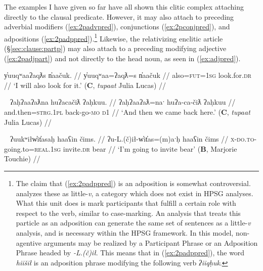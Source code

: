 The examples I have given so far have all shown this clitic complex attaching directly to the clausal predicate. However, it may also attach to preceding adverbial modifiers (\ref{ex:2padvpred}), conjunctions (\ref{ex:2pconjpred}), and adpositions (\ref{ex:2padppred}).\footnote{The claim that (\ref{ex:2padppred}) is an adposition is somewhat controversial. \cite{woo2007b} analyzes these as little-\textit{v}, a category which does not exist in HPSG analyses. What this unit does is mark participants that fulfill a certain role with respect to the verb, similar to case-marking. An analysis that treats this particle as an adposition can generate the same set of sentences as a little-\textit{v} analysis, and is necessary within the HPSG framework. In this model, non-agentive arguments may be realized by a Participant Phrase or an Adposition Phrase headed by \textit{-L.(č)ił}. This means that in (\ref{ex:2padppred}), the word \textit{hiišił} is an adposition phrase modifying the following verb \textit{ʔiiqḥuk}.} Likewise, the relativizing enclitic article (\S\ref{sec:clause:partp}) may also attach to a preceding modifying adjective (\ref{ex:2padjpart}) and not directly to the head noun, as seen in (\ref{ex:adjpred}).

\ex \label{ex:2padvpred}
\begingl
\glpreamble y̓uuqʷaaʔaqƛs n̓aačuk. //
\gla y̓uuqʷaa=ʔaqƛ=s n̓aačuk  //
\glb also=\textsc{fut}=\textsc{1sg} look.for.\textsc{dr} //
\glft `I will also look for it.' (\textbf{C}, \textit{tupaat} Julia Lucas) //
\endgl
\xe

\ex~ \label{ex:2pconjpred}
\begingl
\glpreamble ʔaḥʔaaʔaƛna huʔacačiƛ ʔaḥkuu. //
\gla ʔaḥʔaaʔaƛ=naˑ huʔa-ca-čiƛ ʔaḥkuu  //
\glb and.then=\textsc{strg.1pl} back-go-\textsc{mo} \textsc{d1} //
\glft `And then we came back here.' (\textbf{C}, \textit{tupaat} Julia Lucas) //
\endgl
\xe


\ex~ \label{ex:2padppred}
\begingl
\glpreamble ʔuukʷiłw̓it̓asaḥ haaʕin čims. //
\gla ʔu-L.(č)ił-w̓it̓as=(m)aˑḥ haaʕin čims  //
\glb \textsc{x}-\textsc{do.to}-going.to=\textsc{real.1sg} invite.\textsc{dr} bear //
\glft `I'm going to invite bear' (\textbf{B}, Marjorie Touchie) //
\endgl
\xe

